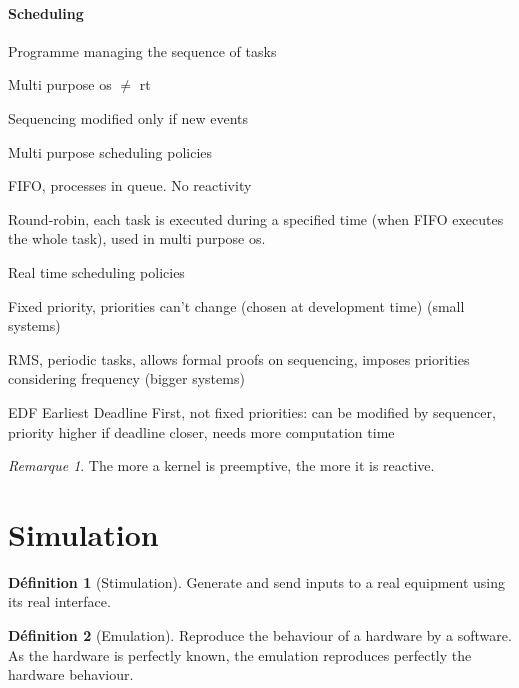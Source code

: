 \documentclass[10pt]{article}
\theoremstyle{plain}
\theoremstyle{definition}
\newtheorem{defn}{Définition}
\theoremstyle{remark}
\newtheorem{rem}{Remarque}
\begin{document}
\paragraph{Scheduling}
\begin{compactitem}
	\item Programme managing the sequence of tasks
	\item Multi purpose os $\ne$ rt
	\item Sequencing modified only if new events
	\item Multi purpose scheduling policies
		\begin{compactitem}
			\item FIFO, processes in queue. No reactivity
			\item Round-robin, each task is executed during a specified time
				(when FIFO executes the whole task), used in multi purpose os.
		\end{compactitem}
	\item Real time scheduling policies
		\begin{compactitem}
			\item Fixed priority, priorities can't change (chosen at development
				time) (small systems)
			\item RMS, periodic tasks, allows formal proofs on
				sequencing, imposes priorities considering frequency (bigger
				systems)
			\item EDF Earliest Deadline First, not fixed priorities: can be
				modified by sequencer, priority higher if deadline closer, needs
				more computation time
		\end{compactitem}
\end{compactitem}
\begin{rem}
	The more a kernel is preemptive, the more it is reactive.
\end{rem}

\section{Simulation}
\begin{defn}
	[Stimulation]
	Generate and send inputs to a real equipment using its real interface.
\end{defn}

\begin{defn}
	[Emulation]
	Reproduce the behaviour of a hardware by a software. As the hardware is
	perfectly known, the emulation reproduces perfectly the hardware behaviour.
\end{defn}
\end{document}

